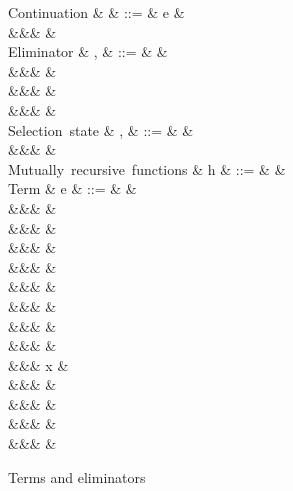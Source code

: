 \begin{figure}[H]
\begin{syntaxfig}
\mbox{Continuation}
&
\kappa
&
::=
&
e
&
\\
&&&
\sigma
&
\\[2mm]
\mbox{Eliminator}
&
\sigma, \tau
&
::=
&
&
\\
&&&
&
\\
&&&
\elimProd{\sigma}
&
\\
&&&
\elimList{\kappa}{\sigma}
&
\\[2mm]
\mbox{Selection state}
&
\alpha, \beta
&
::=
&
\TT
&
\\
&&&
\FF
&
\\[2mm]
\mbox{Mutually recursive functions}
&
h
&
::=
&
&
\\[2mm]
\mbox{Term}
&
e
&
::=
&
\hole
&
\\
&&&
\annTrue{\alpha} \mid \annFalse{\alpha}
&
\\
&&&
&
\\
&&&
&
\\
&&&
\annNil{\alpha}
&
\\
&&&
&
\\
&&&
&
\\
&&&
&
\\
&&&
&
\\
&&&
x
&
\\
&&&
\exOp{\primOp}
&
\\
&&&
\exLambda{\sigma}
&
\\
&&&
&
\\
&&&
&
\end{syntaxfig}
\caption{Terms and eliminators}
\end{figure}
